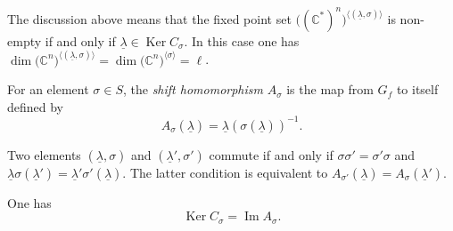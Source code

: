 The discussion above means that the fixed point set $\big(({\mathbb C}^*)^n\big)^{\langle (\underline{\lambda},\sigma) \rangle}$
is non-empty if and only if $\underline{\lambda} \in \operatorname{Ker} C_\sigma$.
In this case one has $\dim \big({\mathbb C}^n\big)^{\langle (\underline{\lambda},\sigma) \rangle}=\dim \big({\mathbb C}^n\big)^{\langle \sigma \rangle}=\ell$.

\begin{Definition} For an element $\sigma \in S$, the {\em shift homomorphism} $A_\sigma$ is the map from $G_f$ to itself defined by
\[
A_\sigma(\underline{\lambda}) = \underline{\lambda}(\sigma(\underline{\lambda}))^{-1}.
\]
\end{Definition}

\begin{Remark} \label{rem:comm}
Two elements $(\underline{\lambda},\sigma)$ and $(\underline{\lambda}', \sigma')$ commute if and only if
$\sigma \sigma'=\sigma' \sigma$ and $\underline{\lambda}\sigma(\underline{\lambda}') =
\underline{\lambda}' \sigma'(\underline{\lambda})$. The latter condition is equivalent to
$A_{\sigma'}(\underline{\lambda})=A_\sigma(\underline{\lambda}')$.
\end{Remark}

\begin{Proposition} \label{prop:C=A}
One has
\[
\operatorname{Ker} C_\sigma = \operatorname{Im} A_\sigma.
\]
\end{Proposition}

